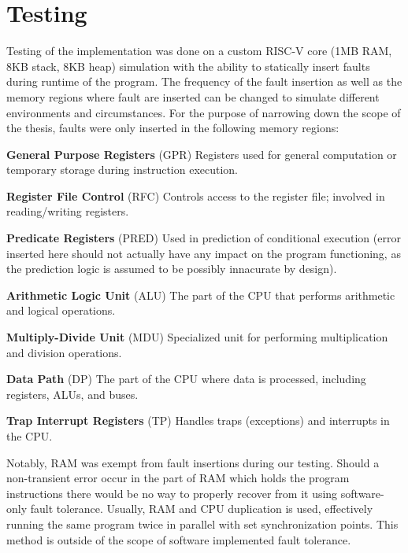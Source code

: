 \documentclass[12pt, letterpaper]{article}
\begin{document}

\clearpage


\clearpage


\clearpage



\section{Testing}

Testing of the implementation was done on a custom RISC-V core (1MB RAM, 8KB stack, 8KB heap) simulation with the ability to statically insert faults during runtime of the program. The frequency of the fault insertion as well as the memory regions where fault are inserted can be changed to simulate different environments and circumstances. For the purpose of narrowing down the scope of the thesis, faults were only inserted in the following memory regions:

\textbf{General Purpose Registers} (GPR)
Registers used for general computation or temporary storage during instruction execution.

\textbf{Register File Control} (RFC)
Controls access to the register file; involved in reading/writing registers.

\textbf{Predicate Registers} (PRED)
Used in prediction of conditional execution (error inserted here should not actually have any impact on the program functioning, as the prediction logic is assumed to be possibly innacurate by design).

\textbf{Arithmetic Logic Unit} (ALU)
The part of the CPU that performs arithmetic and logical operations.

\textbf{Multiply-Divide Unit} (MDU)
Specialized unit for performing multiplication and division operations.

\textbf{Data Path} (DP)
The part of the CPU where data is processed, including registers, ALUs, and buses.

\textbf{Trap Interrupt Registers} (TP)
Handles traps (exceptions) and interrupts in the CPU.

Notably, RAM was exempt from fault insertions during our testing. Should a non-transient error occur in the part of RAM which holds the program instructions there would be no way to properly recover from it using software-only fault tolerance. Usually, RAM and CPU duplication is used, effectively running the same program twice in parallel with set synchronization points. This method is outside of the scope of software implemented fault tolerance.
\end{document}
